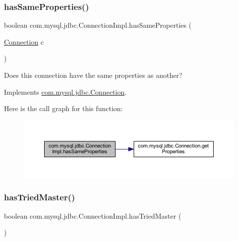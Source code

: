 \subsubsection{\texorpdfstring{has\+Same\+Properties()}{hasSameProperties()}}
{\footnotesize\ttfamily boolean com.\+mysql.\+jdbc.\+Connection\+Impl.\+has\+Same\+Properties (\begin{DoxyParamCaption}\item[{\mbox{\hyperlink{interfacecom_1_1mysql_1_1jdbc_1_1_connection}{Connection}}}]{c }\end{DoxyParamCaption})}

Does this connection have the same properties as another? 

Implements \mbox{\hyperlink{interfacecom_1_1mysql_1_1jdbc_1_1_connection_aa075b035aedfaf2d59114dde53cfc3de}{com.\+mysql.\+jdbc.\+Connection}}.

Here is the call graph for this function\+:\nopagebreak
\begin{figure}[H]
\begin{center}
\leavevmode
\includegraphics[width=350pt]{classcom_1_1mysql_1_1jdbc_1_1_connection_impl_aa1d8937ef315e396f9acfbeea1ff8c8f_cgraph}
\end{center}
\end{figure}
\mbox{\label{classcom_1_1mysql_1_1jdbc_1_1_connection_impl_a0ec4ef24675c2376faaa45c842031f69}} 
\subsubsection{\texorpdfstring{has\+Tried\+Master()}{hasTriedMaster()}}
{\footnotesize\ttfamily boolean com.\+mysql.\+jdbc.\+Connection\+Impl.\+has\+Tried\+Master (\begin{DoxyParamCaption}{ }\end{DoxyParamCaption})}

